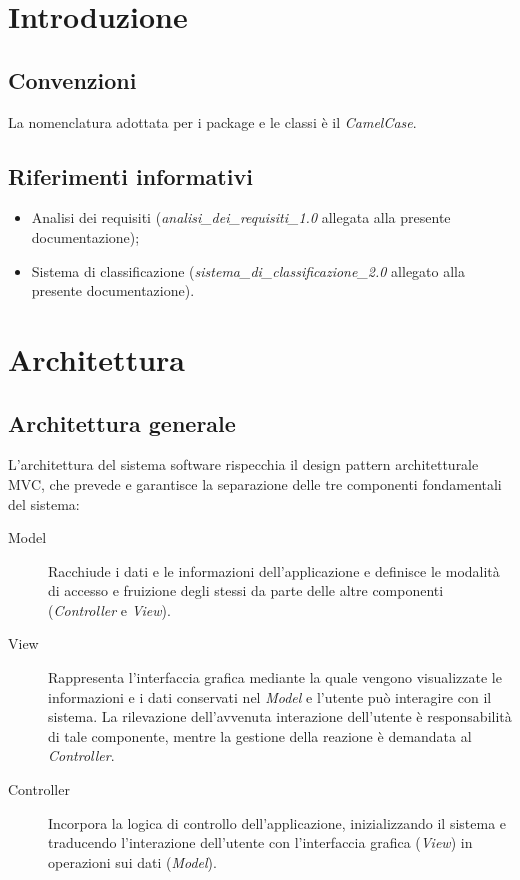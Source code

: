 \documentclass[10pt,a4paper,headinclude,footinclude,hidelinks]{scrreprt} %
\begin{document}
	\tableofcontents

	\listoffigures

	\chapter{Introduzione}
	\label{ch:stage:design:intro}

	\section{Convenzioni}
	La nomenclatura adottata per i package e le classi è il \textit{CamelCase}.

	\section{Riferimenti informativi}
	\begin{itemize}
	\item Analisi dei requisiti (\textit{analisi\_dei\_requisiti\_1.0} allegata alla presente documentazione);
	\item Sistema di classificazione (\textit{sistema\_di\_classificazione\_2.0} allegato alla presente documentazione).
	\end{itemize}

	\chapter{Architettura}
	\label{ch:stage:design:architettura}

	\section{Architettura generale}
	\label{sec:stage:design:architettura:mvc}
	L'architettura del sistema software rispecchia il design pattern architetturale MVC, che prevede e garantisce la separazione delle tre componenti fondamentali del sistema:
	\begin{description}
	\item[Model] Racchiude i dati e le informazioni dell'applicazione e definisce le modalità di accesso e fruizione degli stessi da parte delle altre componenti (\textit{Controller} e \textit{View}).
 	\item[View] Rappresenta l'interfaccia grafica mediante la quale vengono visualizzate le informazioni e i dati conservati nel \textit{Model} e l'utente può interagire con il sistema. La rilevazione dell'avvenuta interazione dell'utente è responsabilità di tale componente, mentre la gestione della reazione è demandata al \textit{Controller}.
	\item[Controller] Incorpora la logica di controllo dell'applicazione, inizializzando il sistema e traducendo l'interazione dell'utente con l'interfaccia grafica (\textit{View}) in operazioni sui dati (\textit{Model}).
	\end{description}
\end{document}
